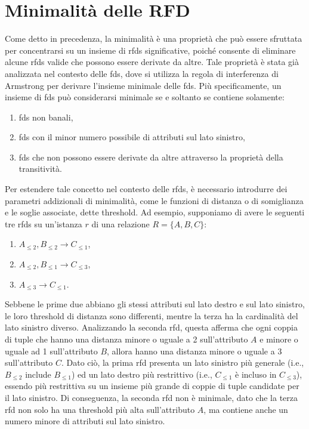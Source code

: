 \section{Minimalit\`{a} delle RFD}
Come detto in precedenza, la minimalit\`{a} \`{e} una propriet\`{a} che pu\`{o} essere sfruttata per concentrarsi su un insieme di \acrshort{rfds} significative, poich\'{e} consente di eliminare alcune \acrshort{rfds} valide che possono essere derivate da altre. Tale propriet\`{a} \`{e} stata gi\`{a} analizzata nel contesto delle \acrshort{fds}, dove si utilizza la regola di interferenza di Armstrong per derivare l'insieme minimale delle \acrshort{fds}. Pi\`{u} specificamente, un insieme di \acrshort{fds} pu\`{o} considerarsi minimale se e soltanto se contiene solamente:
\begin{enumerate}
    \item \acrshort{fds} non banali,
    \item \acrshort{fds} con il minor numero possibile di attributi sul lato sinistro,
    \item \acrshort{fds} che non possono essere derivate da altre attraverso la propriet\`{a} della transitivit\`{a}.
\end{enumerate}\par
Per estendere tale concetto nel contesto delle \acrshort{rfds}, \`{e} necessario introdurre dei parametri addizionali di minimalit\`{a}, come le funzioni di distanza o di somiglianza e le soglie associate, dette threshold. Ad esempio, supponiamo di avere le seguenti tre \acrshort{rfds} su un'istanza $r$ di una relazione $R=\{A,B,C\}$:
\begin{enumerate}
    \item $A_{\leq2},B_{\leq2}\rightarrow C_{\leq1}$,
    \item $A_{\leq2},B_{\leq1}\rightarrow C_{\leq3}$,
    \item $A_{\leq3}\rightarrow C_{\leq1}$.
\end{enumerate}
Sebbene le prime due abbiano gli stessi attributi sul lato destro e sul lato sinistro, le loro threshold di distanza sono differenti, mentre la terza ha la cardinalit\`{a} del lato sinistro diverso. Analizzando la seconda \acrshort{rfd}, questa afferma che ogni coppia di tuple che hanno una distanza minore o uguale a 2 sull'attributo $A$ e minore o uguale ad 1 sull'attributo $B$, allora hanno una distanza minore o uguale a 3 sull'attributo $C$. Dato ci\`{o}, la prima \acrshort{rfd} presenta un lato sinistro pi\`{u} generale (i.e., $B_{\leq2}$ include $B_{\leq1}$) ed un lato destro pi\`{u} restrittivo (i.e., $C_{\leq1}$ \`{e} incluso in $C_{\leq3}$), essendo pi\`{u} restrittiva su un insieme pi\`{u} grande di coppie di tuple candidate per il lato sinistro. Di conseguenza, la seconda \acrshort{rfd} non \`{e} minimale, dato che la terza \acrshort{rfd} non solo ha una threshold pi\`{u} alta sull'attributo $A$, ma contiene anche un numero minore di attributi sul lato sinistro.\par
